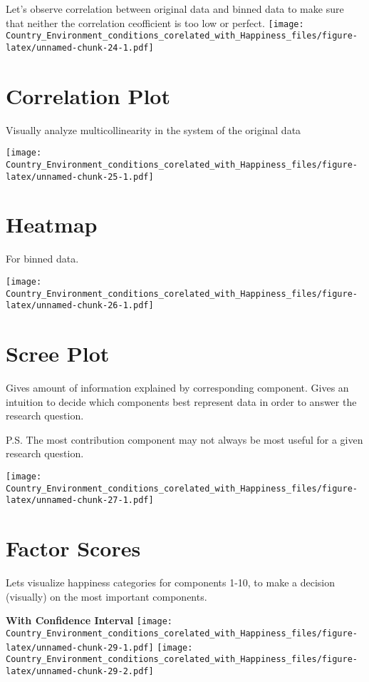 \documentclass[]{book}
\begin{document}
Let's observe correlation between original data and binned data to make
sure that neither the correlation ceofficient is too low or perfect.
\texttt{[image: Country\_Environment\_conditions\_corelated\_with\_Happiness\_files/figure-latex/unnamed-chunk-24-1.pdf]}

\hypertarget{correlation-plot-1}{%
\section{Correlation Plot}\label{correlation-plot-1}}

Visually analyze multicollinearity in the system of the original data

\texttt{[image: Country\_Environment\_conditions\_corelated\_with\_Happiness\_files/figure-latex/unnamed-chunk-25-1.pdf]}

\hypertarget{heatmap}{%
\section{Heatmap}\label{heatmap}}

For binned data.

\texttt{[image: Country\_Environment\_conditions\_corelated\_with\_Happiness\_files/figure-latex/unnamed-chunk-26-1.pdf]}

\hypertarget{scree-plot-1}{%
\section{Scree Plot}\label{scree-plot-1}}

Gives amount of information explained by corresponding component. Gives
an intuition to decide which components best represent data in order to
answer the research question.

P.S. The most contribution component may not always be most useful for a
given research question.

\texttt{[image: Country\_Environment\_conditions\_corelated\_with\_Happiness\_files/figure-latex/unnamed-chunk-27-1.pdf]}

\hypertarget{factor-scores-1}{%
\section{Factor Scores}\label{factor-scores-1}}

Lets visualize happiness categories for components 1-10, to make a
decision (visually) on the most important components.

\textbf{With Confidence Interval}
\texttt{[image: Country\_Environment\_conditions\_corelated\_with\_Happiness\_files/figure-latex/unnamed-chunk-29-1.pdf]}
\texttt{[image: Country\_Environment\_conditions\_corelated\_with\_Happiness\_files/figure-latex/unnamed-chunk-29-2.pdf]}
\end{document}
